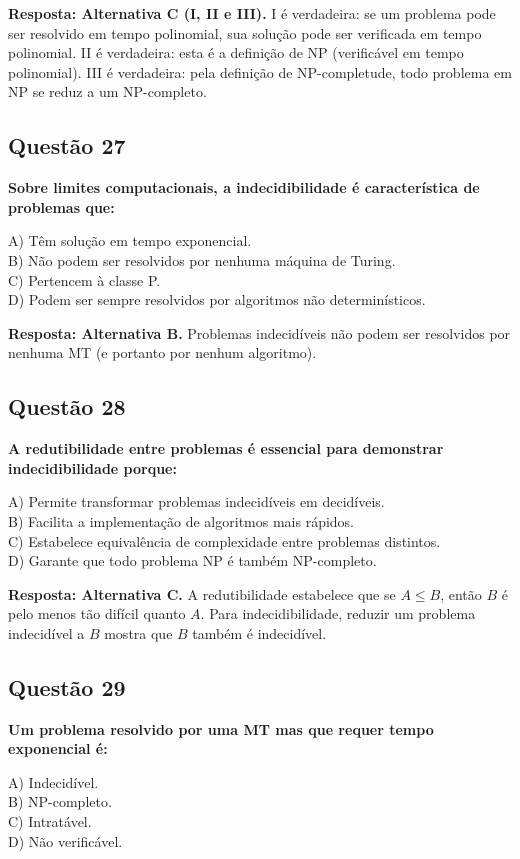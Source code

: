 \documentclass[conference]{IEEEtran}
\begin{document}
\textbf{Resposta: Alternativa C (I, II e III).} 
I é verdadeira: se um problema pode ser resolvido em tempo polinomial, sua solução pode ser verificada em tempo polinomial. 
II é verdadeira: esta é a definição de NP (verificável em tempo polinomial). 
III é verdadeira: pela definição de NP-completude, todo problema em NP se reduz a um NP-completo.

\subsection{Questão 27}
\textbf{Sobre limites computacionais, a indecidibilidade é característica de problemas que:}

A) Têm solução em tempo exponencial. \\
B) Não podem ser resolvidos por nenhuma máquina de Turing. \\
C) Pertencem à classe P. \\
D) Podem ser sempre resolvidos por algoritmos não determinísticos.

\textbf{Resposta: Alternativa B.} Problemas indecidíveis não podem ser resolvidos por nenhuma MT (e portanto por nenhum algoritmo).

\subsection{Questão 28}
\textbf{A redutibilidade entre problemas é essencial para demonstrar indecidibilidade porque:}

A) Permite transformar problemas indecidíveis em decidíveis. \\
B) Facilita a implementação de algoritmos mais rápidos. \\
C) Estabelece equivalência de complexidade entre problemas distintos. \\
D) Garante que todo problema NP é também NP-completo.

\textbf{Resposta: Alternativa C.} A redutibilidade estabelece que se $A \leq B$, então $B$ é pelo menos tão difícil quanto $A$. Para indecidibilidade, reduzir um problema indecidível a $B$ mostra que $B$ também é indecidível.

\subsection{Questão 29}
\textbf{Um problema resolvido por uma MT mas que requer tempo exponencial é:}

A) Indecidível. \\
B) NP-completo. \\
C) Intratável. \\
D) Não verificável.
\end{document}
